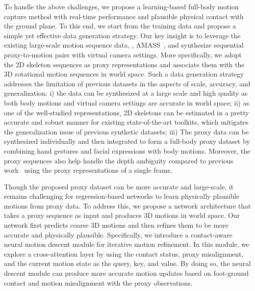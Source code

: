 \documentclass[10pt,twocolumn,letterpaper]{article}
\begin{document}
To handle the above challenges, we propose a learning-based full-body motion capture method with real-time performance and plausible physical contact with the ground plane.
To this end, we start from the training data and propose a simple yet effective data generation strategy.
Our key insight is to leverage the existing large-scale motion sequence data, \ie, AMASS~\cite{mahmood2019amass}, and synthesize sequential proxy-to-motion pairs with virtual camera settings.
More specifically, we adopt the 2D skeleton sequences as proxy representations and associate them with the 3D rotational motion sequences in world space.
Such a data generation strategy addresses the limitation of previous datasets in the aspects of scale, accuracy, and generalization:
i) the data can be synthesized at a large scale and high quality as both body motions and virtual camera settings are accurate in world space;
ii) as one of the well-studied representations, 2D skeletons can be estimated in a pretty accurate and robust manner for existing state-of-the-art toolkits, which mitigates the generalization issue of previous synthetic datasets;
iii) The proxy data can be synthesized individually and then integrated to form a full-body proxy dataset by combining hand gestures and facial expressions with body motions.
Moreover, the proxy sequences also help handle the depth ambiguity compared to previous work~\cite{song2020human} using the proxy representations of a single frame.



Though the proposed proxy dataset can be more accurate and large-scale, it remains challenging for regression-based networks to learn physically plausible motions from proxy data. 
To address this, we propose a network architecture that takes a proxy sequence as input and produces 3D motions in world space.
Our network first predicts coarse 3D motions and then refines them to be more accurate and physically plausible. 
Specifically, we introduce a contact-aware neural motion descent module for iterative motion refinement.
In this module, we explore a cross-attention layer by using the contact status, proxy misalignment, and the current motion state as the query, key, and value.
By doing so, the neural descent module can produce more accurate motion updates based on foot-ground contact and motion misalignment with the proxy observations.
\end{document}
